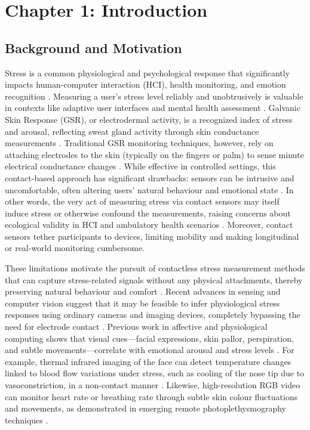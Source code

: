 \documentclass[11pt,a4paper]{report}
\begin{document}
\label{chap:1}
\chapter{Chapter 1: Introduction}

\section{Background and Motivation}

Stress is a common physiological and psychological response that significantly impacts human-computer interaction (HCI), health monitoring, and emotion recognition
.
Measuring a user's stress level reliably and unobtrusively is valuable in contexts like adaptive user interfaces and mental health assessment
.
Galvanic Skin Response (GSR), or electrodermal activity, is a recognized index of stress and arousal, reflecting sweat gland activity through skin conductance measurements \cite{Boucsein2012}
.
Traditional GSR monitoring techniques, however, rely on attaching electrodes to the skin (typically on the fingers or palm) to sense minute electrical conductance changes \cite{Fowles1981}
.
While effective in controlled settings, this contact-based approach has significant drawbacks: sensors can be intrusive and uncomfortable, often altering users' natural behaviour and emotional state \cite{Cacioppo2007}
.
In other words, the very act of measuring stress via contact sensors may itself induce stress or otherwise confound the measurements, raising concerns about ecological validity in HCI and ambulatory health scenarios \cite{Wilhelm2010}
.
Moreover, contact sensors tether participants to devices, limiting mobility and making longitudinal or real-world monitoring cumbersome.

These limitations motivate the pursuit of contactless stress measurement methods that can capture stress-related signals without any physical attachments, thereby preserving natural behaviour and comfort
.
Recent advances in sensing and computer vision suggest that it may be feasible to infer physiological stress responses using ordinary cameras and imaging devices, completely bypassing the need for electrode contact \cite{Picard2001}
.
Previous work in affective and physiological computing shows that visual cues—facial expressions, skin pallor, perspiration, and subtle movements—correlate with emotional arousal and stress levels \cite{Healey2005}
.
For example, thermal infrared imaging of the face can detect temperature changes linked to blood flow variations under stress, such as cooling of the nose tip due to vasoconstriction, in a non-contact manner
.
Likewise, high-resolution RGB video can monitor heart rate or breathing rate through subtle skin colour fluctuations and movements, as demonstrated in emerging remote photoplethysmography techniques \cite{Poh2010}.
\end{document}
